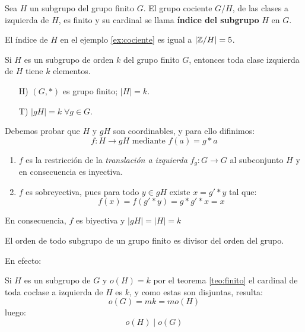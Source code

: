 \begin{fmd-definition}
	Sea $H$ un subgrupo del grupo finito $G$. El grupo cociente $G/H$, de las clases a izquierda de $H$, es finito y su cardinal se llama \textbf{índice del subgrupo} $H$ en $G$.
\end{fmd-definition}

El índice de $H$ en el ejemplo \ref{ex:cociente} es igual a $|\mathbb{Z}/H| = 5$.

\begin{fmd-theorem} \label{teo:finito}
Si $H$ es un subgrupo de orden $k$ del grupo finito $G$, entonces toda clase izquierda de $H$ tiene $k$ elementos.

\begin{itemize}
	\item[H)] $(G, *)$ es grupo finito; $|H| = k$.
	\item[T)] $|gH| = k \; \forall g \in G$.
\end{itemize}
\end{fmd-theorem}
\begin{fmd-proof}
	Debemos probar que $H$ y $gH$ son coordinables, y para ello difinimos:
	\[ f: H \rightarrow gH \mbox{ mediante } f(a) = g * a \]
	\begin{enumerate}[label=\roman*)]
		\item $f$ es la restricción de la \textit{translación a izquierda} $f_g: G \rightarrow G$ al subconjunto $H$ y en consecuencia es inyectiva.
		\item $f$ es sobreyectiva, pues para todo $y \in gH$ existe $x = g'*y$ tal que:
		\[ f(x) = f(g' * y) = g * g' * x = x \]
	\end{enumerate}
	En consecuencia, $f$ es biyectiva y $|gH| = |H| = k$
\end{fmd-proof}

\begin{fmd-theorem}[Lagrange] \label{teo:Lagrange}
	El orden de todo subgrupo de un grupo finito es divisor del orden del grupo.
\end{fmd-theorem}

\begin{fmd-proof} En efecto:
	
	Si $H$ es un subgrupo  de $G$ y $o(H) = k$ por el teorema \ref{teo:finito} el cardinal de toda coclase a izquierda de $H$ es $k$, y como estas son disjuntas, resulta:
	\[ o(G) = mk = m o(H) \]
	luego:
	\[ o(H) \mid o(G) \]
\end{fmd-proof}




